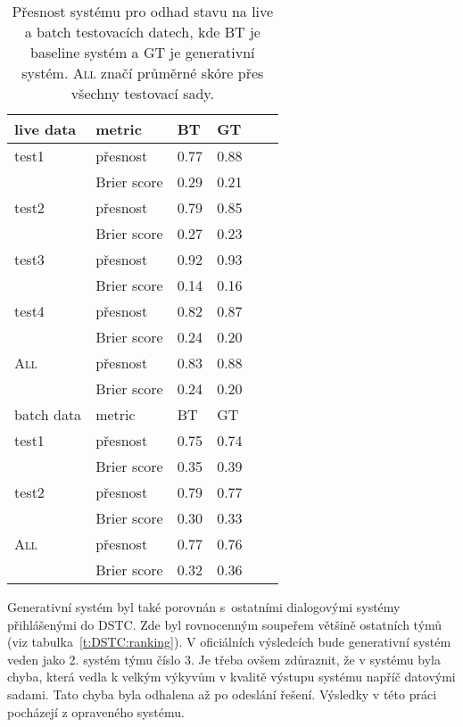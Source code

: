 \begin{table}[htb]
\begin{center}
\begin{tabular}{|l|l|l|l|l|l|}
  \hline
live data & metric      & BT & GT \\
\hline
test1 & přesnost    & 0.77 & 0.88 \\
        & Brier score & 0.29 & 0.21 \\
\hline
test2 & přesnost    & 0.79 & 0.85 \\
        & Brier score & 0.27 & 0.23 \\
\hline
test3  & přesnost    & 0.92 & 0.93 \\
        & Brier score & 0.14 & 0.16 \\
\hline
test4  & přesnost    & 0.82 & 0.87 \\
        & Brier score & 0.24 & 0.20 \\
\hline
\textsc{All}    & přesnost    & 0.83 & 0.88 \\
        & Brier score & 0.24 & 0.20 \\
\hline
\hline
batch data & metric      & BT & GT \\
\hline
test1 & přesnost    & 0.75 & 0.74 \\
        & Brier score & 0.35 & 0.39 \\
\hline
test2 & přesnost    & 0.79 & 0.77 \\
        & Brier score & 0.30 & 0.33 \\
\hline
\textsc{All}    & přesnost    & 0.77 & 0.76 \\
        & Brier score & 0.32 & 0.36 \\
\hline
\end{tabular}
\end{center}
\caption{Přesnost systému pro odhad stavu na live a batch testovacích datech, kde BT je baseline systém a GT je generativní systém. \textsc{All} značí průměrné skóre přes všechny testovací sady.}
\label{t:all:datasets}
\end{table}

Generativní systém byl také porovnán s~ostatními dialogovými systémy přihlášenými do DSTC.
Zde byl rovnocenným soupeřem většině ostatních týmů (viz tabulka~\ref{t:DSTC:ranking}).
V oficiálních výsledcích bude generativní systém veden jako 2. systém týmu číslo 3.
Je třeba ovšem zdůraznit, že v systému byla chyba, která vedla k velkým výkyvům v kvalitě výstupu systému napříč datovými sadami.
Tato chyba byla odhalena až po odeslání řešení.
Výsledky v této práci pocházejí z opraveného systému.

